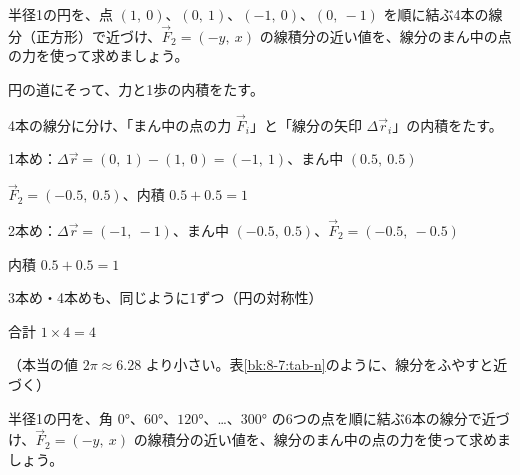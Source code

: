 \begin{reidai}[表計算で円の道をたす]
半径1の円を、点 $(1,\ 0)$、$(0,\ 1)$、$(-1,\ 0)$、$(0,\ -1)$ を順に結ぶ4本の線分（正方形）で近づけ、$\vec F_2=(-y,\ x)$ の線積分の近い値を、線分のまん中の点の力を使って求めましょう。\par
\kangaekata {}\par
{}\enspace 円の道にそって、力と1歩の内積をたす。\par
{}\enspace 4本の線分に分け、「まん中の点の力 $\vec F_i$」と「線分の矢印 $\Delta\vec r_i$」の内積をたす。\par
\shiki\kviiihs{}\zw{} 1本め：$\Delta\vec r=(0,\ 1)-(1,\ 0)=(-1,\ 1)$、まん中 $(0.5,\ 0.5)$\par
\kviiihb $\vec F_2=(-0.5,\ 0.5)$、内積 $0.5+0.5=1$\par
\kviiiha 2本め：$\Delta\vec r=(-1,\ -1)$、まん中 $(-0.5,\ 0.5)$、$\vec F_2=(-0.5,\ -0.5)$\par
\kviiihb 内積 $0.5+0.5=1$\par
\kviiiha 3本め・4本めも、同じように1ずつ（円の対称性）\par
\kviiiha 合計 $1\times4=4$\par
{}（本当の値 $2\pi\approx6.28$ より小さい。表\ref{bk:8-7:tab-n}のように、線分をふやすと近づく）
\end{reidai}

\begin{jibun}
半径1の円を、角 $0°$、$60°$、$120°$、…、$300°$ の6つの点を順に結ぶ6本の線分で近づけ、$\vec F_2=(-y,\ x)$ の線積分の近い値を、線分のまん中の点の力を使って求めましょう。
\end{jibun}

